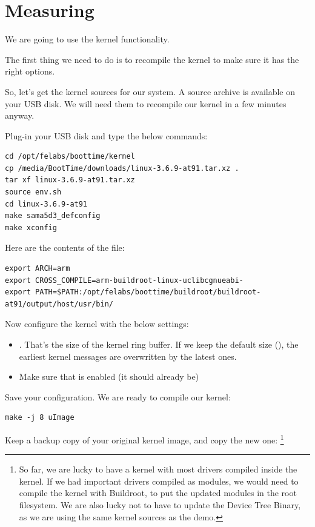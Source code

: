 
\section{Measuring}

We are going to use the kernel  functionality.

The first thing we need to do is to recompile the kernel to make sure
it has the right options.

So, let's get the kernel sources for our system. A source archive
is available on your USB disk. We will need
them to recompile our kernel in a few minutes anyway.

Plug-in your USB disk and type the below commands:

\begin{verbatim}
cd /opt/felabs/boottime/kernel
cp /media/BootTime/downloads/linux-3.6.9-at91.tar.xz .
tar xf linux-3.6.9-at91.tar.xz
source env.sh
cd linux-3.6.9-at91
make sama5d3_defconfig
make xconfig
\end{verbatim}

Here are the contents of the  file:

\begin{verbatim}
export ARCH=arm
export CROSS_COMPILE=arm-buildroot-linux-uclibcgnueabi-
export PATH=$PATH:/opt/felabs/boottime/buildroot/buildroot-at91/output/host/usr/bin/
\end{verbatim}

Now configure the kernel with the below settings:
\begin{itemize}
\item {}. That's the size of the
      kernel ring buffer. If we keep the default size (),
      the earliest kernel messages are overwritten by the
      latest ones.
\item Make sure that  is enabled
      (it should already be)
\end{itemize}

Save your configuration. We are ready to compile our kernel:
\begin{verbatim}
make -j 8 uImage
\end{verbatim}

Keep a backup copy of your original kernel image, and copy the new one:
\footnote{So far, we are lucky to have a kernel with most drivers
compiled inside the kernel. If we had important drivers compiled
as modules, we would need to compile the kernel with Buildroot,
to put the updated modules in the root filesystem. We are also lucky
not to have to update the Device Tree Binary, as we are using
the same kernel sources as the demo.}

